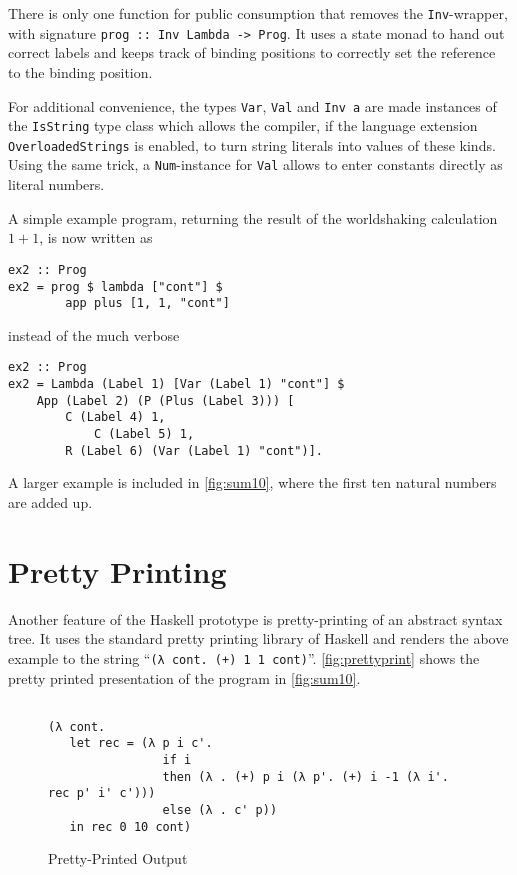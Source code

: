 \documentclass[a4paper,halfparskip,DIV=10,11pt]{scrbook}
\begin{document}
There is only one function for public consumption that removes the \lstinline-Inv--wrapper, with signature \lstinline!prog :: Inv Lambda -> Prog!. It uses a state monad to hand out correct labels and keeps track of binding positions to correctly set the reference to the binding position. 

For additional convenience, the types \lstinline!Var!, \lstinline!Val! and \lstinline!Inv a! are made instances of the \lstinline!IsString! type class which allows the compiler, if the language extension \lstinline!OverloadedStrings! is enabled, to turn string literals into values of these kinds. Using the same trick, a \lstinline!Num!-instance for \lstinline!Val! allows to enter constants directly as literal numbers.

A simple example program, returning the result of the worldshaking calculation $1 + 1$, is now written as
\begin{lstlisting}
ex2 :: Prog
ex2 = prog $ lambda ["cont"] $ 
        app plus [1, 1, "cont"]
\end{lstlisting}
instead of the much verbose
\begin{lstlisting}
ex2 :: Prog
ex2 = Lambda (Label 1) [Var (Label 1) "cont"] $
	App (Label 2) (P (Plus (Label 3))) [
		C (Label 4) 1,
	        C (Label 5) 1,
		R (Label 6) (Var (Label 1) "cont")].
\end{lstlisting}
A larger example is included in \vref{fig:sum10}, where the first ten natural numbers are added up.

\section{Pretty Printing}

Another feature of the Haskell prototype is pretty-printing of an abstract syntax tree. It uses the standard pretty printing library of Haskell \cite{pretty} and renders the above example to the string “\texttt{(λ\ cont.\ (+)\ 1\ 1\ cont)}”. \vref{fig:prettyprint} shows the pretty printed presentation of the program in \vref{fig:sum10}.

\begin{figure}
\centering
\begin{framed}
\small
\begin{verbatim}

(λ cont.
   let rec = (λ p i c'.
                if i
                then (λ . (+) p i (λ p'. (+) i -1 (λ i'. rec p' i' c')))
                else (λ . c' p))
   in rec 0 10 cont)
\end{verbatim}
\end{framed}
\caption{Pretty-Printed Output}
\label{fig:prettyprint}
\end{figure}
\end{document}
